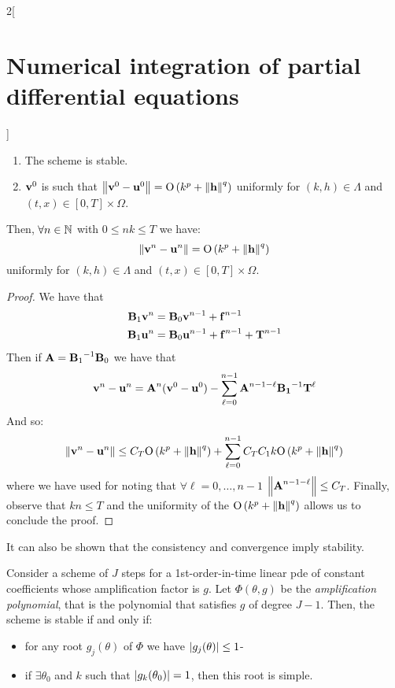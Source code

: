 \documentclass[../../../main_math.tex]{subfiles}
\begin{document}
\begin{multicols}{2}[\section{Numerical integration of partial differential equations}]
\begin{theorem}
\begin{enumerate}
      \item The scheme is stable.
      \item $\boldsymbol{\mathrm{v}}^0$ is such that $\left\|\boldsymbol{\mathrm{v}}^0-\boldsymbol{\mathrm{u}}^0\right\|=\mathrm{O}\left(k^p+\left\|\boldsymbol{\mathrm{h}}\right\|^q\right)$ uniformly for $(k,h)\in\Lambda$ and $(t,x)\in[0,T]\times\Omega$.
    \end{enumerate}
    Then, $\forall n\in\mathbb{N}$ with $0\leq nk\leq T$ we have:
    $$
      \left\|\boldsymbol{\mathrm{v}}^n-\boldsymbol{\mathrm{u}}^n\right\|=\mathrm{O}\left(k^p+\left\|\boldsymbol{\mathrm{h}}\right\|^q\right)
    $$
    uniformly for $(k,h)\in\Lambda$ and $(t,x)\in[0,T]\times\Omega$.
  \end{theorem}
  \begin{proof}
    We have that
    \begin{align*}
      \boldsymbol{\mathrm{B}}_1\boldsymbol{\mathrm{v}}^{n} & =\boldsymbol{\mathrm{B}}_0\boldsymbol{\mathrm{v}}^{n-1}+\boldsymbol{\mathrm{f}}^{n-1}               \\
      \boldsymbol{\mathrm{B}}_1\boldsymbol{\mathrm{u}}^{n} & =\boldsymbol{\mathrm{B}}_0\boldsymbol{\mathrm{u}}^{n-1} +\boldsymbol{\mathrm{f}}^{n-1}+\boldsymbol{\mathrm{T}}^{n-1}
    \end{align*}
    Then if $\boldsymbol{\mathrm{A}}= {\boldsymbol{\mathrm{B}}_1}^{-1}\boldsymbol{\mathrm{B}}_0$ we have that
    $$\boldsymbol{\mathrm{v}}^n-\boldsymbol{\mathrm{u}}^n=\boldsymbol{\mathrm{A}}^n(\boldsymbol{\mathrm{v}}^0-\boldsymbol{\mathrm{u}}^0)-\sum_{\ell=0}^{n-1}\boldsymbol{\mathrm{A}}^{n-1-\ell}{\boldsymbol{\mathrm{B_1}}}^{-1}\boldsymbol{\mathrm{T}}^\ell$$
    And so:
    $$
      \left\|\boldsymbol{\mathrm{v}}^n-\boldsymbol{\mathrm{u}}^n\right\|\leq C_T \mathrm{O}\left(k^p+\left\|\boldsymbol{\mathrm{h}}\right\|^q\right)+\sum_{\ell=0}^{n-1}C_T C_1k\mathrm{O}\left(k^p+\left\|\boldsymbol{\mathrm{h}}\right\|^q\right)
    $$
    where we have used  for noting that $\forall\ell=0,\ldots,n-1$ $\left\|\boldsymbol{\mathrm{A}}^{n-1-\ell}\right\|\leq C_T$.
    Finally, observe that $kn\leq T$ and the uniformity of the $\mathrm{O}\left(k^p+\left\|\boldsymbol{\mathrm{h}}\right\|^q\right)$ allows us to conclude the proof.
  \end{proof}
  \begin{remark}
    It can also be shown that the consistency and convergence imply stability.
  \end{remark}
  \begin{theorem}
    Consider a scheme of $J$ steps for a 1st-order-in-time linear pde of constant coefficients whose amplification factor is $g$. Let $\Phi(\theta, g)$ be the \emph{amplification polynomial}, that is the polynomial that satisfies $g$ of degree $J-1$. Then, the scheme is stable if and only if:
    \begin{itemize}
      \item for any root $g_j(\theta)$ of $\Phi$ we have $\abs{g_j(\theta)}\leq 1$-
      \item if $\exists \theta_0$ and $k$ such that $\abs{g_k(\theta_0)}=1$, then this root is simple.
    \end{itemize}
  \end{theorem}
  \begin{proposition}

\end{proposition}
\end{multicols}
\end{document}

